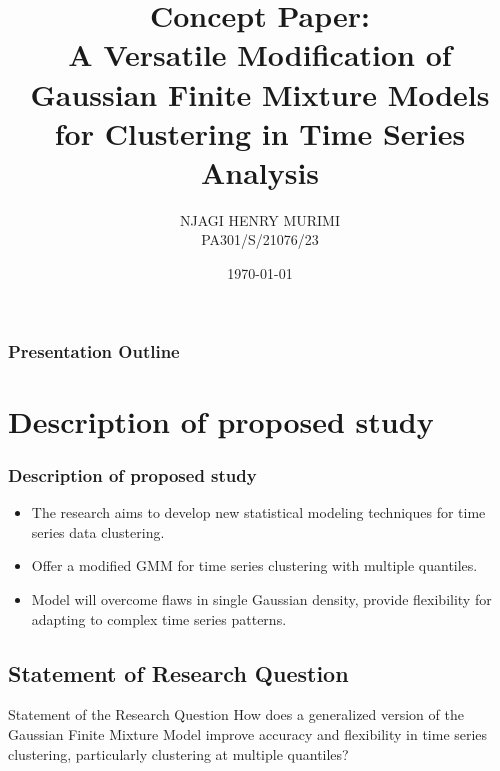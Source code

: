 \documentclass[unknownkeysallowed]{beamer}
\title[Concept Paper]{\textbf{Concept Paper}: \\A Versatile Modification of Gaussian Finite Mixture Models for Clustering in Time Series Analysis}
\author[NJAGI HENRY MURIMI]{\large NJAGI HENRY MURIMI\\ \vspace{0.5cm}PA301/S/21076/23\\ %
}
\date{\today}
\begin{document}
	\begin{frame}
		\titlepage
	\end{frame}
	\begin{frame}
		\frametitle{\textbf{Presentation Outline}}
		\tableofcontents{}
	\end{frame}
	
	\section{Description of proposed study}
	\begin{frame}
		\frametitle{\textbf{Description of proposed study}}
	\begin{itemize}
	\item The research aims to develop new statistical modeling techniques for time series data clustering. 
	\item Offer a modified GMM for time series clustering with multiple quantiles. \\
	\item Model will overcome flaws in single Gaussian density, provide flexibility for adapting to complex time series patterns.
	\end{itemize}
\end{frame}

\subsection{Statement of Research Question}
\begin{frame}{Statement of the Research Question}
	How does a generalized version of the Gaussian Finite Mixture Model improve accuracy and flexibility in time series clustering, particularly clustering at multiple quantiles?
\end{frame}
\end{document}
